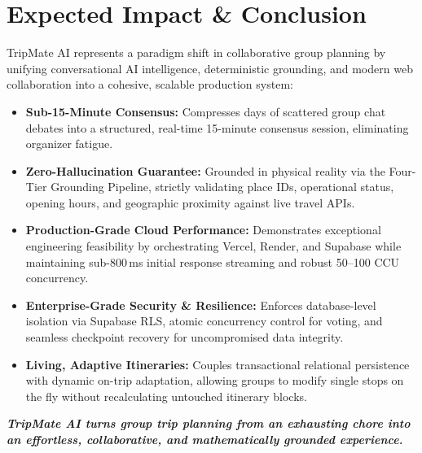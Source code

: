 \documentclass[11pt,a4paper]{article}
\begin{document}
\section{Expected Impact \& Conclusion}
\label{sec:conclusion}
TripMate AI represents a paradigm shift in collaborative group planning by unifying conversational AI intelligence, deterministic grounding, and modern web collaboration into a cohesive, scalable production system:
\begin{itemize}
\item \textbf{Sub-15-Minute Consensus:} Compresses days of scattered group chat debates into a structured, real-time 15-minute consensus session, eliminating organizer fatigue.
\item \textbf{Zero-Hallucination Guarantee:} Grounded in physical reality via the Four-Tier Grounding Pipeline, strictly validating place IDs, operational status, opening hours, and geographic proximity against live travel APIs.
\item \textbf{Production-Grade Cloud Performance:} Demonstrates exceptional engineering feasibility by orchestrating Vercel, Render, and Supabase while maintaining sub-800\,ms initial response streaming and robust 50--100 CCU concurrency.
\item \textbf{Enterprise-Grade Security \& Resilience:} Enforces database-level isolation via Supabase RLS, atomic concurrency control for voting, and seamless checkpoint recovery for uncompromised data integrity.
\item \textbf{Living, Adaptive Itineraries:} Couples transactional relational persistence with dynamic on-trip adaptation, allowing groups to modify single stops on the fly without recalculating untouched itinerary blocks.
\end{itemize}

\vspace{0.25cm}
\begin{center}
\small\color{primaryblue}\textbf{\textit{TripMate AI turns group trip planning from an exhausting chore into an effortless, collaborative, and mathematically grounded experience.}}
\end{center}
\end{document}
